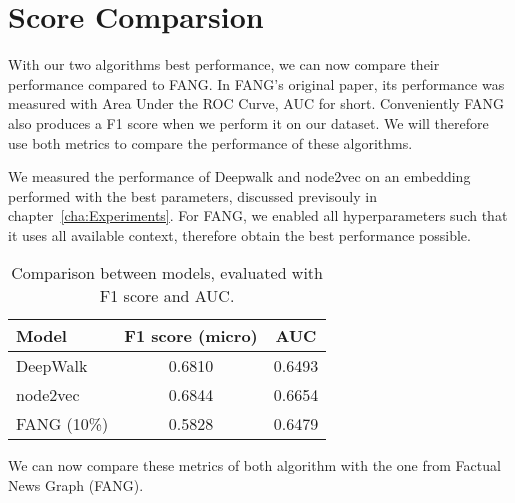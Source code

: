 \newpage
\section{Score Comparsion}

With our two algorithms best performance, we can now compare their performance compared to FANG.
In FANG's original paper, its performance was measured with Area Under the ROC Curve, AUC for short.
Conveniently FANG also produces a F1 score when we perform it on our dataset.
We will therefore use both metrics to compare the performance of these algorithms.

We measured the performance of Deepwalk and node2vec on an embedding performed with the best parameters, discussed previsouly in chapter~\ref{cha:Experiments}.
For FANG, we enabled all hyperparameters such that it uses all available context, therefore obtain the best performance possible.

\begin{table}[h]
    \centering
    \caption{Comparison between models, evaluated with F1 score and AUC.}
    \label{tab:}
    \begin{tabular}{lcc}
        \toprule
        Model & F1 score (micro) & AUC \\
        \midrule
        DeepWalk & 0.6810 & 0.6493 \\
        node2vec & 0.6844 & 0.6654 \\
        FANG (10\%) & 0.5828 & 0.6479 \\
        \bottomrule
    \end{tabular}
\end{table}
We can now compare these metrics of both algorithm with the one from Factual News Graph (FANG).

\iffalse
\subsubsection{Notes}

Just like Deepwalk and node2vec, FANG produces both F1 score and AUC using the sklearn library.
The AUC uses the default ($average=macro$).

However the F1 produced uses $average=binary$.
We have F1 micro and macro score for DeepWalk and node2vec.
Which one should we use, or do we need to run the program with binary F1?



\fi

